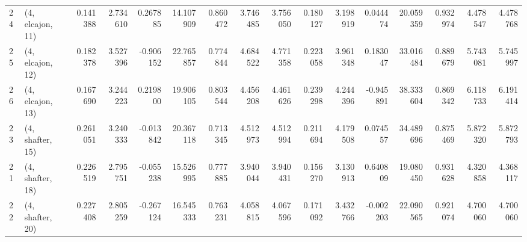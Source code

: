 \begin{tabular}{llrrrrrrrrrrrrrr}
24 &  (4, elcajon, 11) &   0.141388 &  2.734610 &  0.267885 &  14.107909 &  0.860472 &   3.746485 &  3.756050 &  0.180127 &   3.198919 &  0.044474 &   20.059359 &  0.932974 &   4.478547 &   4.478768 \\
25 &  (4, elcajon, 12) &   0.182378 &  3.527396 & -0.906152 &  22.765857 &  0.774844 &   4.684522 &  4.771358 &  0.223058 &   3.961348 &  0.183047 &   33.016484 &  0.889679 &   5.743081 &   5.745997 \\
26 &  (4, elcajon, 13) &   0.167690 &  3.244223 &  0.219800 &  19.906105 &  0.803544 &   4.456208 &  4.461626 &  0.239298 &   4.244396 & -0.945891 &   38.333604 &  0.869342 &   6.118733 &   6.191414 \\
23 &  (4, shafter, 15) &   0.261051 &  3.240333 & -0.013842 &  20.367118 &  0.713345 &   4.512973 &  4.512994 &  0.211694 &   4.179508 &  0.074557 &   34.489696 &  0.875469 &   5.872320 &   5.872793 \\
21 &  (4, shafter, 18) &   0.226519 &  2.795751 & -0.055238 &  15.526995 &  0.777885 &   3.940044 &  3.940431 &  0.156270 &   3.130913 &  0.640809 &   19.080450 &  0.931628 &   4.320858 &   4.368117 \\
22 &  (4, shafter, 20) &   0.227408 &  2.805259 & -0.267124 &  16.545333 &  0.763231 &   4.058815 &  4.067596 &  0.171092 &   3.432766 & -0.002203 &   22.090565 &  0.921074 &   4.700060 &   4.700060 \\
\bottomrule
\end{tabular}
